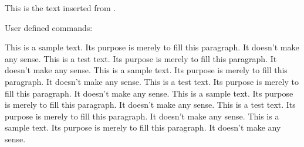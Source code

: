 

This is the text inserted from .

User defined commands:  \helloworld

This is a sample text. Its purpose is merely to fill this paragraph. It doesn't
make any sense. This is a test text. Its purpose is merely to fill this
paragraph. It doesn't make any sense. This is a sample text. Its purpose is
merely to fill this paragraph. It doesn't make any sense. This is a test text.
Its purpose is merely to fill this paragraph. It doesn't make any sense. This
is a sample text. Its purpose is merely to fill this paragraph. It doesn't make
any sense. This is a test text. Its purpose is merely to fill this paragraph. It
doesn't make any sense. This is a sample text. Its purpose is merely to fill
this paragraph. It doesn't make any sense.

